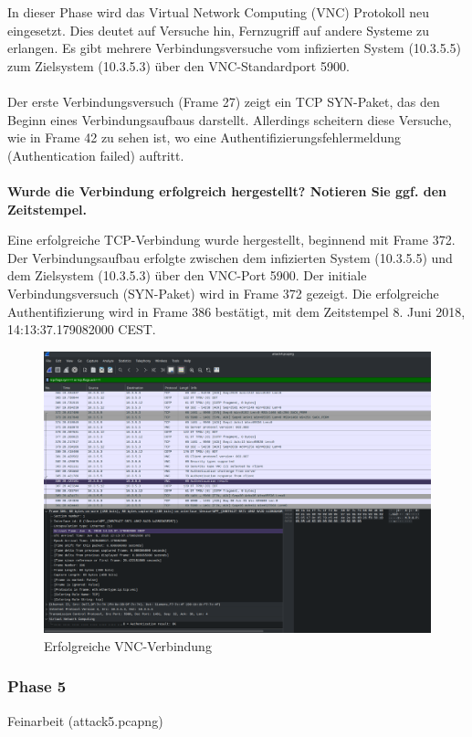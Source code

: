 \documentclass[
    a4paper,
    pagesize,
	pdftex,
    12pt,
]{scrartcl}
\begin{document}
In dieser Phase wird das Virtual Network Computing (VNC) Protokoll neu eingesetzt. Dies deutet auf Versuche hin, Fernzugriff auf andere Systeme zu erlangen. Es gibt mehrere Verbindungsversuche vom infizierten System (10.3.5.5) zum Zielsystem (10.3.5.3) über den VNC-Standardport 5900.
\\ \\
Der erste Verbindungsversuch (Frame 27) zeigt ein TCP SYN-Paket, das den Beginn eines Verbindungsaufbaus darstellt. Allerdings scheitern diese Versuche, wie in Frame 42 zu sehen ist, wo eine Authentifizierungsfehlermeldung (Authentication failed) auftritt.
\\ \\
\textbf{Wurde die Verbindung erfolgreich hergestellt? Notieren Sie ggf. den Zeitstempel.}

Eine erfolgreiche TCP-Verbindung wurde hergestellt, beginnend mit Frame 372. Der Verbindungsaufbau erfolgte zwischen dem infizierten System (10.3.5.5) und dem Zielsystem (10.3.5.3) über den VNC-Port 5900. Der initiale Verbindungsversuch (SYN-Paket) wird in Frame 372 gezeigt. Die erfolgreiche Authentifizierung wird in Frame 386 bestätigt, mit dem Zeitstempel 8. Juni 2018, 14:13:37.179082000 CEST.

\begin{figure}[H]
    \centering
    \includegraphics[width=\textwidth]{ws-vnc-connection.png}
    \caption{Erfolgreiche VNC-Verbindung}
    \label{fig:ws-vnc-connection}
\end{figure}

\subsubsection{Phase 5}
Feinarbeit (attack5.pcapng)
\end{document}
